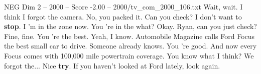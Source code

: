 \begin{textsample}{NEG Dim 2 – 2000 – Score -2.00 – 2000/tv\_com\_2000\_106.txt}  \label{ex:f2_neg_001}
Wait, wait.
I think I forgot the camera.
No, you packed it.
Can you check?
I don't want to \textbf{stop}.
I 'm in the zone now.
You 're in the what?
Okay.
Ryan, can you just check?
Fine, fine.
You 're the best.
Yeah, I know.
Automobile Magazine calls Ford Focus the best small car to drive.
Someone already knows.
You 're good.
And now every Focus comes with 100,000 mile powertrain coverage.
You know what I think?
We forgot the...
Nice \textbf{try}.
If you haven't looked at Ford lately, look again.

\end{textsample}
